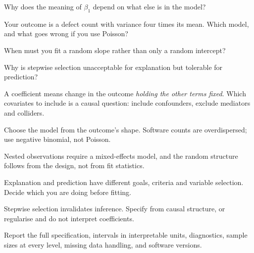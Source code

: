 \begin{checkpoint}
\begin{tightnum}
  \item Why does the meaning of $\beta_1$ depend on what else is in the model?
  \item Your outcome is a defect count with variance four times its mean. Which
    model, and what goes wrong if you use Poisson?
  \item When must you fit a random slope rather than only a random intercept?
  \item Why is stepwise selection unacceptable for explanation but tolerable
    for prediction?
\end{tightnum}
\end{checkpoint}

\begin{chaptersummary}
\begin{tight}
  \item A coefficient means change in the outcome \emph{holding the other terms
    fixed}. Which covariates to include is a causal question: include
    confounders, exclude mediators and colliders.
  \item Choose the model from the outcome's shape. Software counts are
    overdispersed; use negative binomial, not Poisson.
  \item Nested observations require a mixed-effects model, and the random
    structure follows from the design, not from fit statistics.
  \item Explanation and prediction have different goals, criteria and variable
    selection. Decide which you are doing before fitting.
  \item Stepwise selection invalidates inference. Specify from causal structure,
    or regularise and do not interpret coefficients.
  \item Report the full specification, intervals in interpretable units,
    diagnostics, sample sizes at every level, missing data handling, and
    software versions.
\end{tight}
\end{chaptersummary}

